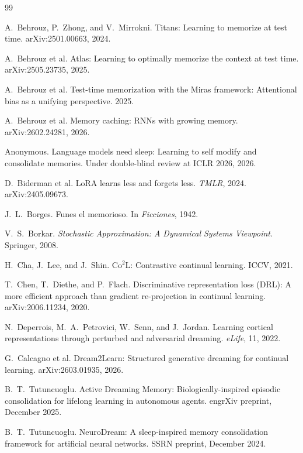 \documentclass[11pt]{article}
\begin{document}
\begin{thebibliography}{99}
\small

 A.\ Behrouz, P.\ Zhong, and V.\ Mirrokni. Titans: Learning to memorize at test time. arXiv:2501.00663, 2024.

 A.\ Behrouz et al. Atlas: Learning to optimally memorize the context at test time. arXiv:2505.23735, 2025.

 A.\ Behrouz et al. Test-time memorization with the Miras framework: Attentional bias as a unifying perspective. 2025.

 A.\ Behrouz et al. Memory caching: RNNs with growing memory. arXiv:2602.24281, 2026.

 Anonymous. Language models need sleep: Learning to self modify and consolidate memories. Under double-blind review at ICLR 2026, 2026.

 D.\ Biderman et al. LoRA learns less and forgets less. \textit{TMLR}, 2024. arXiv:2405.09673.

 J.\ L.\ Borges. Funes el memorioso. In \textit{Ficciones}, 1942.

 V.\ S.\ Borkar. \textit{Stochastic Approximation: A Dynamical Systems Viewpoint}. Springer, 2008.

 H.\ Cha, J.\ Lee, and J.\ Shin. Co$^2$L: Contrastive continual learning. ICCV, 2021.

 T.\ Chen, T.\ Diethe, and P.\ Flach. Discriminative representation loss (DRL): A more efficient approach than gradient re-projection in continual learning. arXiv:2006.11234, 2020.

 N.\ Deperrois, M.\ A.\ Petrovici, W.\ Senn, and J.\ Jordan. Learning cortical representations through perturbed and adversarial dreaming. \textit{eLife}, 11, 2022.

 G.\ Calcagno et al. Dream2Learn: Structured generative dreaming for continual learning. arXiv:2603.01935, 2026.

 B.\ T.\ Tutuncuoglu. Active Dreaming Memory: Biologically-inspired episodic consolidation for lifelong learning in autonomous agents. engrXiv preprint, December 2025.

 B.\ T.\ Tutuncuoglu. NeuroDream: A sleep-inspired memory consolidation framework for artificial neural networks. SSRN preprint, December 2024.


\end{thebibliography}
\end{document}
